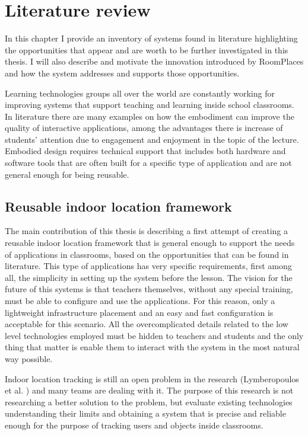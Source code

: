 \chapter{Literature review}

\label{chap:lit_rev}

In this chapter I provide an inventory of systems found in literature highlighting the opportunities that appear and are worth to be further investigated in this thesis. I will also describe and motivate the innovation introduced by RoomPlaces and how the system addresses and supports those opportunities.

Learning technologies groups all over the world are constantly working for improving systems that support teaching and learning inside school classrooms. In literature there are many examples on how the embodiment can improve the quality of interactive applications, among the advantages there is increase of students’ attention due to engagement and enjoyment in the topic of the lecture. Embodied design requires technical support that includes both hardware and software tools that are often built for a specific type of application and are not general enough for being reusable.

\section{Reusable indoor location framework}
The main contribution of this thesis is describing a first attempt of creating a reusable indoor location framework that is general enough to support the needs of applications in classrooms, based on the opportunities that can be found in literature. This type of applications has very specific requirements, first among all, the simplicity in setting up the system before the lesson. The vision for the future of this systems is that teachers themselves, without any special training, must be able to configure and use the applications. For this reason, only a lightweight infrastructure placement and an easy and fast configuration is acceptable for this scenario. All the overcomplicated details related to the low level technologies employed must be hidden to teachers and students and the only thing that matter is enable them to interact with the system in the most natural way possible.

Indoor location tracking is still an open problem in the research (Lymberopoulos et al. \cite{lymberopoulos:indoor_tracking}) and many teams are dealing with it. The purpose of this research is not researching a better solution to the problem, but evaluate existing technologies understanding their limits and obtaining a system that is precise and reliable enough for the purpose of tracking users and objects inside classrooms.

